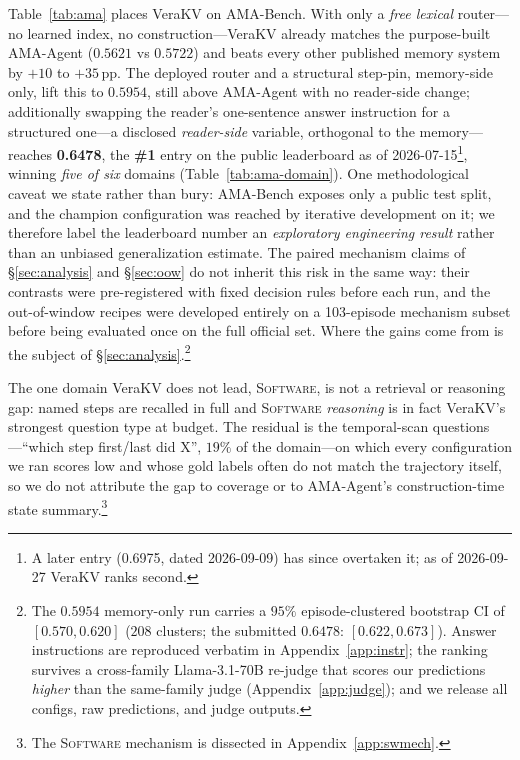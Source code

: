 \documentclass{article} %
\newcommand{\pp}{\,\mathrm{pp}}
\newcommand{\kvm}{VeraKV}
\begin{document}
Table~\ref{tab:ama} places \kvm{} on AMA-Bench. With only a \emph{free lexical}
router---no learned index, no construction---\kvm{} already matches the purpose-built
AMA-Agent ($0.5621$ vs $0.5722$) and beats every other published memory system by
$+10$ to $+35\pp$. The deployed router and a structural step-pin, memory-side only, lift this to
$0.5954$, still above AMA-Agent with no reader-side change; additionally swapping the
reader's one-sentence answer instruction for a structured one---a disclosed
\emph{reader-side} variable, orthogonal to the memory---reaches \textbf{0.6478}, the
\textbf{\#1} entry on the public leaderboard as of 2026-07-15\footnote{A later entry (0.6975, dated 2026-09-09)
has since overtaken it; as of 2026-09-27 \kvm{} ranks second.}, winning \emph{five of six} domains
(Table~\ref{tab:ama-domain}). One methodological caveat we state rather than bury:
AMA-Bench exposes only a public test split, and the champion configuration was reached
by iterative development on it; we therefore label the leaderboard number an
\emph{exploratory engineering result} rather than an unbiased generalization estimate.
The paired mechanism claims of \S\ref{sec:analysis} and \S\ref{sec:oow} do not inherit
this risk in the same way: their contrasts were pre-registered with fixed decision
rules before each run, and the out-of-window recipes were developed entirely on a
103-episode mechanism subset before being evaluated once on the full official set.
Where the gains come from is the subject of
\S\ref{sec:analysis}.\footnote{The $0.5954$ memory-only run carries a $95\%$
episode-clustered bootstrap CI of $[0.570,0.620]$ ($208$ clusters; the submitted
$0.6478$: $[0.622,0.673]$). Answer instructions are reproduced verbatim in
Appendix~\ref{app:instr}; the ranking survives a cross-family Llama-3.1-70B re-judge
that scores our predictions \emph{higher} than the same-family judge
(Appendix~\ref{app:judge}); and we release all configs, raw predictions, and judge
outputs.}

The one domain \kvm{} does not lead, \textsc{Software}, is not a retrieval or
reasoning gap: named steps are recalled in full and
\textsc{Software} \emph{reasoning} is in fact \kvm{}'s strongest question type at
budget. The residual is the temporal-scan questions---``which step first/last did
X'', $19\%$ of the domain---on which every configuration we ran scores low and
whose gold labels often do not match the trajectory itself, so we do not attribute
the gap to coverage or to AMA-Agent's construction-time state summary.\footnote{The
\textsc{Software} mechanism is dissected in Appendix~\ref{app:swmech}.}
\end{document}
